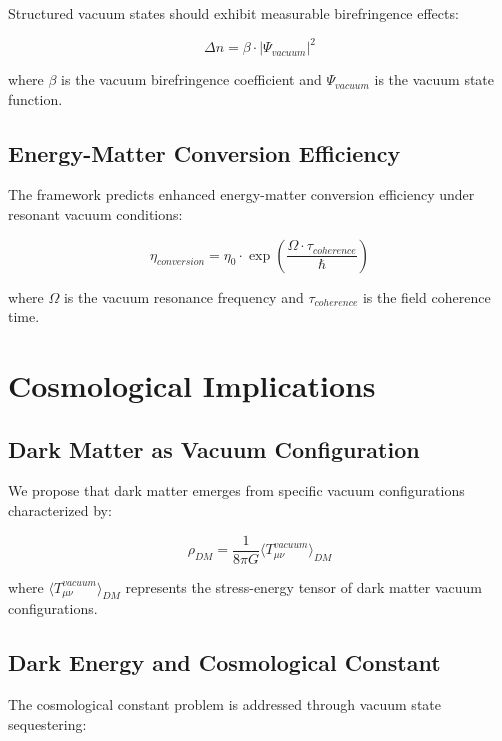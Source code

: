 \documentclass[12pt,a4paper]{article}
\begin{document}
Structured vacuum states should exhibit measurable birefringence effects:

\begin{equation}
\Delta n = \beta \cdot |\Psi_{vacuum}|^2
\end{equation}

where $\beta$ is the vacuum birefringence coefficient and $\Psi_{vacuum}$ is the vacuum state function.

\subsection{Energy-Matter Conversion Efficiency}

The framework predicts enhanced energy-matter conversion efficiency under resonant vacuum conditions:

\begin{equation}
\eta_{conversion} = \eta_0 \cdot \exp\left(\frac{\Omega \cdot \tau_{coherence}}{\hbar}\right)
\end{equation}

where $\Omega$ is the vacuum resonance frequency and $\tau_{coherence}$ is the field coherence time.

\section{Cosmological Implications}

\subsection{Dark Matter as Vacuum Configuration}

We propose that dark matter emerges from specific vacuum configurations characterized by:

\begin{equation}
\rho_{DM} = \frac{1}{8\pi G} \langle T_{\mu\nu}^{vacuum} \rangle_{DM}
\end{equation}

where $\langle T_{\mu\nu}^{vacuum} \rangle_{DM}$ represents the stress-energy tensor of dark matter vacuum configurations.

\subsection{Dark Energy and Cosmological Constant}

The cosmological constant problem is addressed through vacuum state sequestering:
\end{document}

